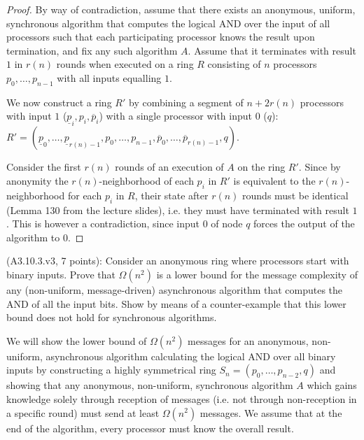 \begin{proof}
By way of contradiction, assume that there exists an anonymous, uniform,
synchronous algorithm that computes the logical AND over the input of
all processors such that each participating processor knows the result upon termination,
and fix any such algorithm $A$.
Assume that it terminates with result $1$ in $r(n)$ rounds when executed on a ring $R$ consisting
of $n$ processors $p_0, \ldots, p_{n-1}$ with all inputs equalling $1$.

We now construct a ring $R'$ by combining a segment of $n + 2r(n)$ processors with input $1$
($\underline{p}_i, p_i, \overline{p}_i$) with a single processor with input $0$ ($q$):
$R' = 
(\underline{p}_0, \ldots, \underline{p}_{r(n) - 1},
 p_0, \ldots, p_{n-1},
 \overline{p}_0, \ldots, \overline{p}_{r(n) - 1},
 q)$.

Consider the first $r(n)$ rounds of an execution of $A$ on the ring $R'$. Since by anonymity
the $r(n)$-neighborhood
of each $p_i$ in $R'$ is equivalent to the $r(n)$-neighborhood for each $p_i$ in $R$, their state
after $r(n)$ rounds must be identical (Lemma 130 from the lecture slides),
i.e. they must have terminated with result $1$. This is however
a contradiction, since input $0$ of node $q$ forces the output of the algorithm to $0$.
\end{proof}


\begin{Exc}{(A3.10.3.v3, 7 points):}
Consider an anonymous ring where processors start with binary
inputs. Prove that $\Omega(n^2)$ is a lower bound for the
message complexity of any (non-uniform, message-driven)
asynchronous algorithm that computes the AND of all the
input bits. Show by means of a counter-example that this
lower bound does not hold for synchronous algorithms.
\end{Exc}

We will show the lower bound of $\Omega(n^2)$ messages for an anonymous, non-uniform,
asynchronous algorithm calculating the logical AND over all binary inputs by
constructing a highly symmetrical ring $S_n = (p_0, \ldots, p_{n-2}, q)$ and showing
that any anonymous, non-uniform, synchronous algorithm $A$ which gains knowledge solely
through reception of messages (i.e. not through non-reception in a specific round)
must send at least $\Omega(n^2)$ messages.
We assume
that at the end of the algorithm, every processor must know the overall result.

